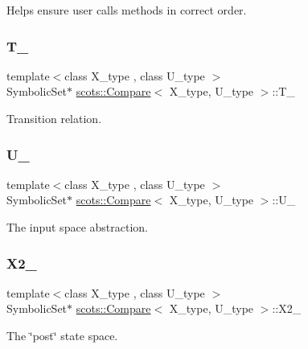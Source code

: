 Helps ensure user calls methods in correct order. \mbox{\label{classscots_1_1Compare_aeb0830d94286ae12672cf1ea183afb1d}} 
\subsubsection{\texorpdfstring{T\+\_\+}{T\_}}
{\footnotesize\ttfamily template$<$class X\+\_\+type , class U\+\_\+type $>$ \\
Symbolic\+Set$\ast$ \hyperlink{classscots_1_1Compare}{scots\+::\+Compare}$<$ X\+\_\+type, U\+\_\+type $>$\+::T\+\_\+}

Transition relation. \mbox{\label{classscots_1_1Compare_ac341e6c2534e4bb4ab248cc767c33b8d}} 
\subsubsection{\texorpdfstring{U\+\_\+}{U\_}}
{\footnotesize\ttfamily template$<$class X\+\_\+type , class U\+\_\+type $>$ \\
Symbolic\+Set$\ast$ \hyperlink{classscots_1_1Compare}{scots\+::\+Compare}$<$ X\+\_\+type, U\+\_\+type $>$\+::U\+\_\+}

The input space abstraction. \mbox{\label{classscots_1_1Compare_a3f1ba24992e2dfe24358087aeecb5a75}} 
\subsubsection{\texorpdfstring{X2\+\_\+}{X2\_}}
{\footnotesize\ttfamily template$<$class X\+\_\+type , class U\+\_\+type $>$ \\
Symbolic\+Set$\ast$ \hyperlink{classscots_1_1Compare}{scots\+::\+Compare}$<$ X\+\_\+type, U\+\_\+type $>$\+::X2\+\_\+}

The \char`\"{}post\char`\"{} state space. \mbox{\label{classscots_1_1Compare_a4d0bb95aefd7ffeda946bd79a8170825}} 
